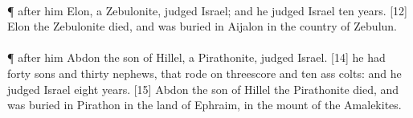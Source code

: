 \\
\P \textcolor[cmyk]{0.99998,1,0,0}{ after him Elon, a Zebulonite, judged Israel; and he judged Israel ten years.}
[12] \textcolor[cmyk]{0.99998,1,0,0}{ Elon the Zebulonite died, and was buried in Aijalon in the country of Zebulun.}\\
\\
\P \textcolor[cmyk]{0.99998,1,0,0}{ after him Abdon the son of Hillel, a Pirathonite, judged Israel.}
[14] \textcolor[cmyk]{0.99998,1,0,0}{ he had forty sons and thirty nephews, that rode on threescore and ten ass colts: and he judged Israel eight years.}
[15] \textcolor[cmyk]{0.99998,1,0,0}{ Abdon the son of Hillel the Pirathonite died, and was buried in Pirathon in the land of Ephraim, in the mount of the Amalekites.}